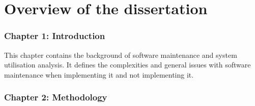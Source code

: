 \section{Overview of the dissertation}
\subsubsection{Chapter 1: Introduction}
This chapter contains the background of software maintenance and system utilisation analysis. It defines the complexities and general issues with software maintenance when implementing it and not implementing it.
\subsubsection{Chapter 2: Methodology}